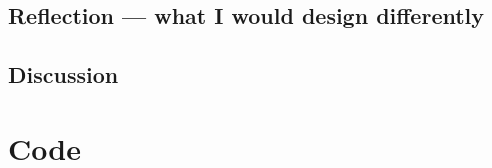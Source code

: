 \section{Reflection --- what I would design differently}
%
%

\section{Discussion}

\appendix
\chapter{Code}
